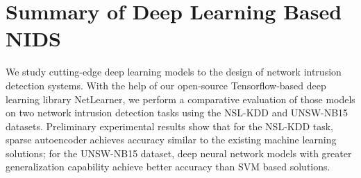 \section{Summary of Deep Learning Based NIDS}

We study cutting-edge deep learning models to the design of network intrusion detection systems.
With the help of our open-source Tensorflow-based deep learning library NetLearner,
we perform a comparative evaluation of those models on two network intrusion detection tasks using the NSL-KDD and UNSW-NB15 datasets.
Preliminary experimental results show that for the NSL-KDD task, sparse autoencoder achieves accuracy similar to the existing machine learning solutions;
for the UNSW-NB15 dataset, deep neural network models with greater generalization capability achieve better accuracy than SVM based solutions.


